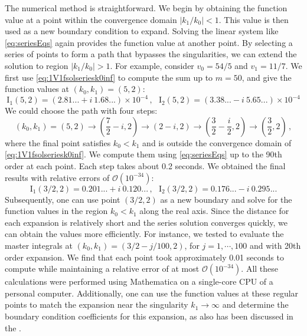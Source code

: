 \documentclass[a4paper,11pt]{article}
\begin{document}
The numerical method is straightforward. We begin by obtaining the function value at a point within the convergence domain \(|k_1 / k_0| < 1\). This value is then used as a new boundary condition to expand.  Solving the linear system like \eqref{eq:seriesEqs} again provides the function value at another point. By selecting a series of points to form a path that bypasses the singularities, we can extend the solution to region \(|k_1 / k_0| > 1\). For example, consider \(v_0 = 54/5\) and \(v_1=11/7\). We first use \eqref{eq:1V1fsolseriesk0inf} to compute the sum up to \( m = 50 \), and give the function values at \((k_0,k_1)=(5,2)\):
\begin{equation}
\text{I}_{1}(5,2)=(2.81...  + i~ 1.68... ) \times 10^{-4} \, , ~~~\text{I}_{2}(5,2)=(3.38...  - i~ 5.65... )\times  10^{-4}
\end{equation}
We could choose the path with four steps:
\begin{equation}
(k_0,k_1)=(5,2)\to\left(\frac{7}{2}-i,2\right)\to(2-i,2)\to\left(\frac{3}{2}-\frac{i}{2},2\right)\to\left(\frac{3}{2},2\right)\,,
\end{equation}
where the final point satisfies \( k_0 < k_1 \) and is outside the convergence domain of \eqref{eq:1V1fsolseriesk0inf}. We compute them using \eqref{eq:seriesEqs} up to the 90th order at each point. Each step takes about 0.2 seconds. We obtained the final results with relative errors of \( \mathcal{O}(10^{-34}) \):
\begin{equation}
\text{I}_{1}(3/2,2)=0.201... + i~ 
 0.120...\, , ~~~\text{I}_{2}(3/2,2)=0.176...  - i~ 0.295... 
\end{equation}
Subsequently, one can use point \( (3/2,2) \) as a new boundary and solve for the function values in the region \( k_0 < k_1 \) along the real axis. Since the distance for each expansion is relatively short and the series solution converges quickly, we can obtain the values more efficiently. For instance, we tested to evaluate the master integrals at $(k_0,k_1)=(3/2-j/100,2)$, for $j=1,\cdots,100$ and with 20th order expansion. We find that each point took approximately 0.01 seconds to compute while maintaining a relative error of at most \( \mathcal{O}(10^{-34}) \). All these calculations were performed using Mathematica on a single-core CPU of a personal computer.
Additionally, one can use the function values at these regular points to match the expansion near the singularity \( k_1 \to \infty \) and determine the boundary condition coefficients for this expansion, as also has been discussed in the \cite{Moriello:2019yhu}.
\end{document}
